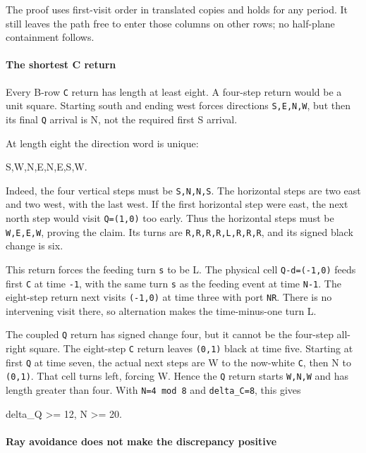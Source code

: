 \documentclass[11pt,letterpaper]{article}
\theoremstyle{plain}
\theoremstyle{definition}
\begin{document}
\begin{NoHyper}
The proof uses first-visit order in translated copies and holds for any period. It still leaves the path free to enter those columns on other rows; no half-plane containment follows.

\paragraph{The shortest C return}

Every B-row \texttt{C} return has length at least eight. A four-step return would be a unit square. Starting south and ending west forces directions \texttt{S,E,N,W}, but then its final \texttt{Q} arrival is N, not the required first S arrival.

At length eight the direction word is unique:

\begin{codeblock}
S,W,N,E,N,E,S,W.
\end{codeblock}

Indeed, the four vertical steps must be \texttt{S,N,N,S}. The horizontal steps are two east and two west, with the last west. If the first horizontal step were east, the next north step would visit \texttt{Q=(1,0)} too early. Thus the horizontal steps must be \texttt{W,E,E,W}, proving the claim. Its turns are \texttt{R,R,R,R,L,R,R,R}, and its signed black change is six.

This return forces the feeding turn \texttt{s} to be L. The physical cell \texttt{Q-d=(-1,0)} feeds first \texttt{C} at time \texttt{-1}, with the same turn \texttt{s} as the feeding event at time \texttt{N-1}. The eight-step return next visits \texttt{(-1,0)} at time three with port \texttt{NR}. There is no intervening visit there, so alternation makes the time-minus-one turn L.

The coupled \texttt{Q} return has signed change four, but it cannot be the four-step all-right square. The eight-step \texttt{C} return leaves \texttt{(0,1)} black at time five. Starting at first \texttt{Q} at time seven, the actual next steps are W to the now-white \texttt{C}, then N to \texttt{(0,1)}. That cell turns left, forcing W. Hence the \texttt{Q} return starts \texttt{W,N,W} and has length greater than four. With \texttt{N=4\ mod\ 8} and \texttt{delta\_C=8}, this gives

\begin{codeblock}
delta_Q >= 12,       N >= 20.
\end{codeblock}

\paragraph{Ray avoidance does not make the discrepancy positive}


\end{NoHyper}
\end{document}
